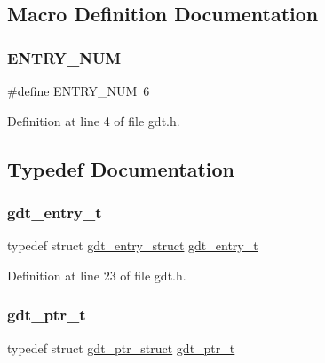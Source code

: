 \subsection{Macro Definition Documentation}
\mbox{\label{a00092_abe29d44fbb5292a15af80cbb8e8a3a7d_abe29d44fbb5292a15af80cbb8e8a3a7d}} 
\subsubsection{\texorpdfstring{E\+N\+T\+R\+Y\+\_\+\+N\+UM}{ENTRY\_NUM}}
{\footnotesize\ttfamily \#define E\+N\+T\+R\+Y\+\_\+\+N\+UM~6}



Definition at line 4 of file gdt.\+h.



\subsection{Typedef Documentation}
\mbox{\label{a00092_ab0b5c60e06a63669c783705278ff641e_ab0b5c60e06a63669c783705278ff641e}} 
\subsubsection{\texorpdfstring{gdt\+\_\+entry\+\_\+t}{gdt\_entry\_t}}
{\footnotesize\ttfamily typedef struct \hyperlink{a00206}{gdt\+\_\+entry\+\_\+struct} \hyperlink{a00092_ab0b5c60e06a63669c783705278ff641e_ab0b5c60e06a63669c783705278ff641e}{gdt\+\_\+entry\+\_\+t}}



Definition at line 23 of file gdt.\+h.

\mbox{\label{a00092_a3bf3fa6f397bda8399e1afb6283b66ca_a3bf3fa6f397bda8399e1afb6283b66ca}} 
\subsubsection{\texorpdfstring{gdt\+\_\+ptr\+\_\+t}{gdt\_ptr\_t}}
{\footnotesize\ttfamily typedef struct \hyperlink{a00202}{gdt\+\_\+ptr\+\_\+struct} \hyperlink{a00092_a3bf3fa6f397bda8399e1afb6283b66ca_a3bf3fa6f397bda8399e1afb6283b66ca}{gdt\+\_\+ptr\+\_\+t}}



